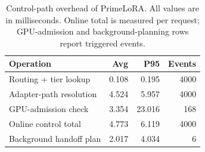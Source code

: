 \begin{table}[t]
\centering
\caption{Control-path overhead of PrimeLoRA. All values are in milliseconds. Online total is measured per request; GPU-admission and background-planning rows report triggered events.}
\label{tab:control_path_overhead}
\footnotesize
\setlength{\tabcolsep}{2.6pt}
\renewcommand{\arraystretch}{1.10}
\begin{tabular}{lrrr}
\toprule
Operation & Avg & P95 & Events \\
\midrule
Routing + tier lookup & 0.108 & 0.195 & 4000 \\
Adapter-path resolution & 4.524 & 5.957 & 4000 \\
GPU-admission check & 3.354 & 23.016 & 168 \\
Online control total & 4.773 & 6.119 & 4000 \\
Background handoff plan & 2.017 & 4.034 & 6 \\
\bottomrule
\end{tabular}
\end{table}
